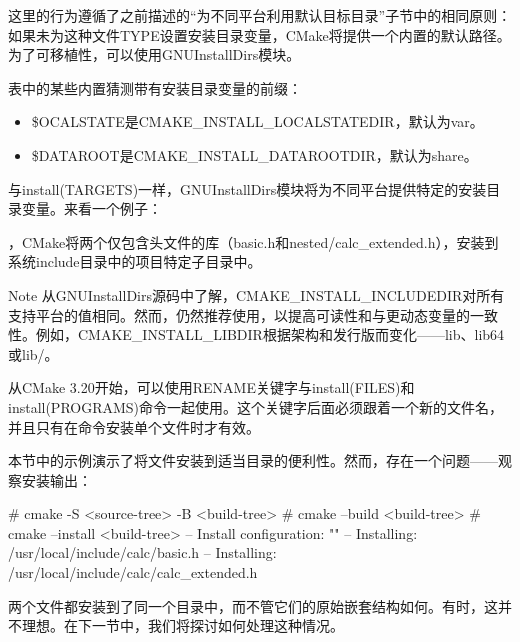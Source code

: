 这里的行为遵循了之前描述的“为不同平台利用默认目标目录”子节中的相同原则：如果未为这种文件TYPE设置安装目录变量，CMake将提供一个内置的默认路径。为了可移植性，可以使用GNUInstallDirs模块。

表中的某些内置猜测带有安装目录变量的前缀：

\begin{itemize}
\item
\$OCALSTATE是CMAKE\_INSTALL\_LOCALSTATEDIR，默认为var。

\item
\$DATAROOT是CMAKE\_INSTALL\_DATAROOTDIR，默认为share。
\end{itemize}

与install(TARGETS)一样，GNUInstallDirs模块将为不同平台提供特定的安装目录变量。来看一个例子：



，CMake将两个仅包含头文件的库（basic.h和nested/calc\_extended.h），安装到系统include目录中的项目特定子目录中。

\begin{myNotic}{Note}
从GNUInstallDirs源码中了解，CMAKE\_INSTALL\_INCLUDEDIR对所有支持平台的值相同。然而，仍然推荐使用，以提高可读性和与更动态变量的一致性。例如，CMAKE\_INSTALL\_LIBDIR根据架构和发行版而变化——lib、lib64或lib/。
\end{myNotic}

从CMake 3.20开始，可以使用RENAME关键字与install(FILES)和install(PROGRAMS)命令一起使用。这个关键字后面必须跟着一个新的文件名，并且只有在命令安装单个文件时才有效。

本节中的示例演示了将文件安装到适当目录的便利性。然而，存在一个问题——观察安装输出：

\begin{shell}
# cmake -S <source-tree> -B <build-tree>
# cmake --build <build-tree>
# cmake --install <build-tree>
-- Install configuration: ""
-- Installing: /usr/local/include/calc/basic.h
-- Installing: /usr/local/include/calc/calc_extended.h
\end{shell}

两个文件都安装到了同一个目录中，而不管它们的原始嵌套结构如何。有时，这并不理想。在下一节中，我们将探讨如何处理这种情况。

